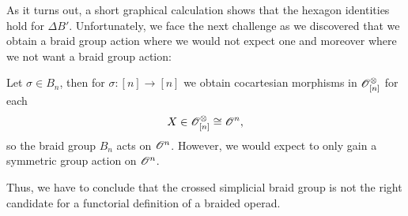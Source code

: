 As it turns out, a short graphical calculation shows that the hexagon identities hold for $\Delta B'$.
Unfortunately, we face the next challenge as we discovered that we obtain a braid group action 
where we would not expect one and moreover where we not want a braid group action:

Let $\sigma \in B_n$, then for $\sigma \colon [n] \to [n]$ we obtain cocartesian morphisms in $\mathscr{O}^{\otimes}_{[n]}$ for
each $$X \in \mathscr{O}^{\otimes}_{[n]} \cong \mathscr{O}^n,$$ so the braid group $B_n$ acts on $\mathscr{O}^n$. However, we would expect to only
gain a symmetric group action on $\mathscr{O}^n$.

Thus, we have to conclude that the crossed simplicial braid group is not the right candidate for
a functorial definition of a braided operad.